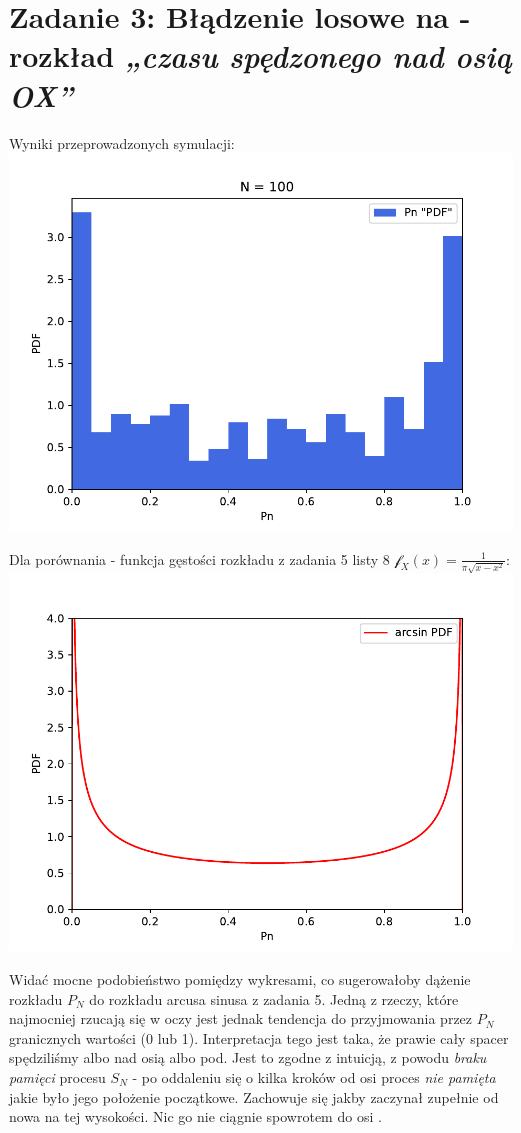 \documentclass{article}
\begin{document}
\section*{Zadanie 3: Błądzenie losowe na  - rozkład \textit{„czasu spędzonego nad osią OX”}}

Wyniki przeprowadzonych symulacji:
\hspace*{-0cm} \includegraphics[scale=0.5]{./plots/exc3.pdf}

Dla porównania - funkcja gęstości rozkładu z zadania 5 listy 8 \( \mathcal{f}_X\left(x\right) = \frac{1}{\pi\sqrt{x - x^2}} \):
\hspace*{-0cm} \includegraphics[scale=0.5]{./plots/exc3-arcsin.pdf}

Widać mocne podobieństwo pomiędzy wykresami, co sugerowałoby dążenie rozkładu \( P_N \) do rozkładu arcusa sinusa z zadania 5.
Jedną z rzeczy, które najmocniej rzucają się w oczy jest jednak tendencja do przyjmowania przez \( P_N \) granicznych wartości (0 lub 1).
Interpretacja tego jest taka, że prawie cały spacer spędziliśmy albo nad osią  albo pod.
Jest to zgodne z intuicją, z powodu \textit{braku pamięci} procesu \( S_N \) - po oddaleniu się o kilka kroków od osi  
proces \textit{nie pamięta} jakie było jego położenie początkowe. Zachowuje się jakby zaczynał zupełnie od nowa na tej wysokości.
Nic go nie ciągnie spowrotem do osi .
\end{document}
